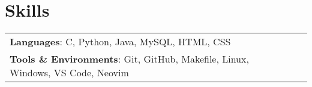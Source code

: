 \documentclass[letterpaper,11pt]{article}
\begin{document}
    
\section{Skills}
    \vspace{-2pt}
    \begin{itemize}[leftmargin=0.2in, label={}]
        {\item{
            \begin{tabular}{ l@{\hskip 0.2in} l }
                 \textbf{Languages}{: C, Python, Java, MySQL, HTML, CSS} \\
                \textbf{Tools \& Environments}{: Git, GitHub, Makefile, Linux, Windows, VS Code, Neovim} \\
            \end{tabular}
        }}
    \end{itemize}
\end{document}
